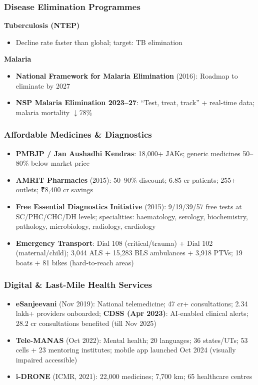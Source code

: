 \subsubsection*{Disease Elimination Programmes}

\textbf{Tuberculosis (NTEP)}
\begin{itemize}
  \item Decline rate faster than global; target: TB elimination
\end{itemize}

\textbf{Malaria}
\begin{itemize}
  \item \textbf{National Framework for Malaria Elimination} (2016): Roadmap to eliminate by 2027
  \item \textbf{NSP Malaria Elimination 2023--27}: ``Test, treat, track'' + real-time data; malaria mortality $\downarrow$78\%
\end{itemize}

\subsubsection*{Affordable Medicines \& Diagnostics}

\begin{itemize}
  \item \textbf{PMBJP / Jan Aushadhi Kendras}: 18,000+ JAKs; generic medicines 50--80\% below market price
  \item \textbf{AMRIT Pharmacies} (2015): 50--90\% discount; 6.85 cr patients; 255+ outlets; ₹8,400 cr savings
  \item \textbf{Free Essential Diagnostics Initiative} (2015): 9/19/39/57 free tests at SC/PHC/CHC/DH levels; specialities: haematology, serology, biochemistry, pathology, microbiology, radiology, cardiology
  \item \textbf{Emergency Transport}: Dial 108 (critical/trauma) + Dial 102 (maternal/child); 3,044 ALS + 15,283 BLS ambulances + 3,918 PTVs; 19 boats + 81 bikes (hard-to-reach areas)
\end{itemize}

\subsubsection*{Digital \& Last-Mile Health Services}

\begin{itemize}
  \item \textbf{eSanjeevani} (Nov 2019): National telemedicine; 47 cr+ consultations; 2.34 lakh+ providers onboarded; \textbf{CDSS (Apr 2023)}: AI-enabled clinical alerts; 28.2 cr consultations benefited (till Nov 2025)
  \item \textbf{Tele-MANAS} (Oct 2022): Mental health; 20 languages; 36 states/UTs; 53 cells + 23 mentoring institutes; mobile app launched Oct 2024 (visually impaired accessible)
  \item \textbf{i-DRONE} (ICMR, 2021): 22,000 medicines; 7,700 km; 65 healthcare centres
\end{itemize}

